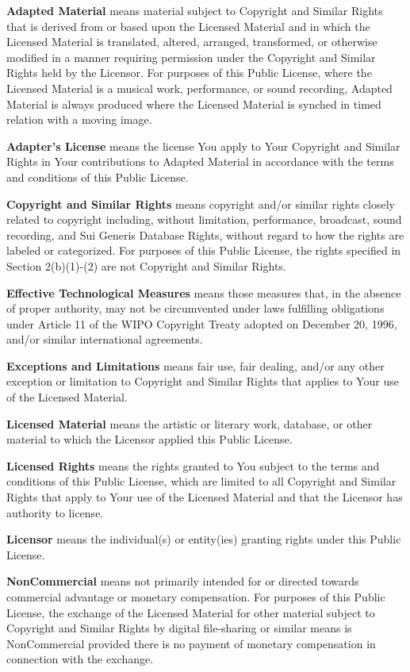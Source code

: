 \begin{doclicense@enumerate}
\item \textbf{Adapted Material} means material subject to Copyright and Similar Rights that is derived from or based upon the Licensed Material and in which the Licensed Material is translated, altered, arranged, transformed, or otherwise modified in a manner requiring permission under the Copyright and Similar Rights held by the Licensor. For purposes of this Public License, where the Licensed Material is a musical work, performance, or sound recording, Adapted Material is always produced where the Licensed Material is synched in timed relation with a moving image.
\item \textbf{Adapter's License} means the license You apply to Your Copyright and Similar Rights in Your contributions to Adapted Material in accordance with the terms and conditions of this Public License.
\item \textbf{Copyright and Similar Rights} means copyright and/or similar rights closely related to copyright including, without limitation, performance, broadcast, sound recording, and Sui Generis Database Rights, without regard to how the rights are labeled or categorized. For purposes of this Public License, the rights specified in Section 2(b)(1)-(2) are not Copyright and Similar Rights.
\item \textbf{Effective Technological Measures} means those measures that, in the absence of proper authority, may not
be circumvented under laws fulfilling obligations under Article 11 of the WIPO Copyright Treaty adopted on December 20, 1996, and/or similar
international agreements.
\item \textbf{Exceptions and Limitations} means fair use, fair dealing, and/or any other exception or limitation to Copyright and Similar Rights that applies to Your use of the Licensed Material.
\item \textbf{Licensed Material} means the artistic or literary work, database, or other material to which the Licensor applied this Public License.
\item \textbf{Licensed Rights} means the rights granted to You subject to the terms and conditions of this Public License, which are limited to all Copyright and Similar Rights that apply to Your use of the Licensed Material and that the Licensor has authority to license.
\item \textbf{Licensor} means the individual(s) or entity(ies) granting rights under this Public License.
\item \textbf{NonCommercial} means not primarily intended for or directed towards commercial advantage or monetary compensation. For purposes of this Public License, the exchange of the Licensed Material for other material subject to Copyright and Similar Rights by digital file-sharing or similar means is NonCommercial provided there is no payment of monetary compensation in connection with the exchange.

\end{doclicense@enumerate}
